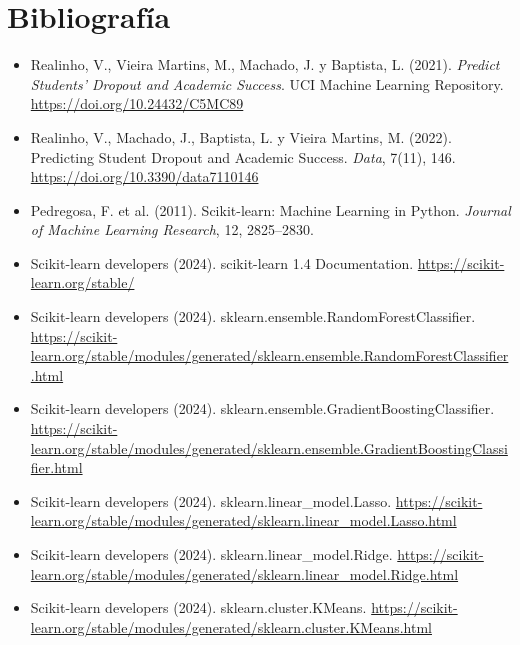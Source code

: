 \documentclass[11pt,letterpaper]{article}
\begin{document}
\section{Bibliografía}
\begin{itemize}[leftmargin=1.2em,itemsep=3pt]
\small
\item Realinho, V., Vieira Martins, M., Machado, J. y Baptista, L. (2021). \emph{Predict Students' Dropout and Academic Success}. UCI Machine Learning Repository. \url{https://doi.org/10.24432/C5MC89}
\item Realinho, V., Machado, J., Baptista, L. y Vieira Martins, M. (2022). Predicting Student Dropout and Academic Success. \emph{Data}, 7(11), 146. \url{https://doi.org/10.3390/data7110146}
\item Pedregosa, F. et al. (2011). Scikit-learn: Machine Learning in Python. \emph{Journal of Machine Learning Research}, 12, 2825--2830.
\item Scikit-learn developers (2024). scikit-learn 1.4 Documentation. \url{https://scikit-learn.org/stable/}
\item Scikit-learn developers (2024). sklearn.ensemble.RandomForestClassifier. \url{https://scikit-learn.org/stable/modules/generated/sklearn.ensemble.RandomForestClassifier.html}
\item Scikit-learn developers (2024). sklearn.ensemble.GradientBoostingClassifier. \url{https://scikit-learn.org/stable/modules/generated/sklearn.ensemble.GradientBoostingClassifier.html}
\item Scikit-learn developers (2024). sklearn.linear\_model.Lasso. \url{https://scikit-learn.org/stable/modules/generated/sklearn.linear_model.Lasso.html}
\item Scikit-learn developers (2024). sklearn.linear\_model.Ridge. \url{https://scikit-learn.org/stable/modules/generated/sklearn.linear_model.Ridge.html}
\item Scikit-learn developers (2024). sklearn.cluster.KMeans. \url{https://scikit-learn.org/stable/modules/generated/sklearn.cluster.KMeans.html}
\end{itemize}
\end{document}
